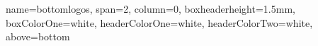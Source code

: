 \documentclass[a0paper,portrait]{baposter}
\begin{document}
\begin{poster}


%

\headerbox{}
{name=bottomlogos, span=2, column=0, boxheaderheight=1.5mm, boxColorOne=white, headerColorOne=white, headerColorTwo=white, above=bottom}{
\newlength{\logoheight}
\setlength{\logoheight}{6mm}
\begin{center}
\setlength{\tabcolsep}{0mm}


\end{center}}
\end{poster}
\end{document}
